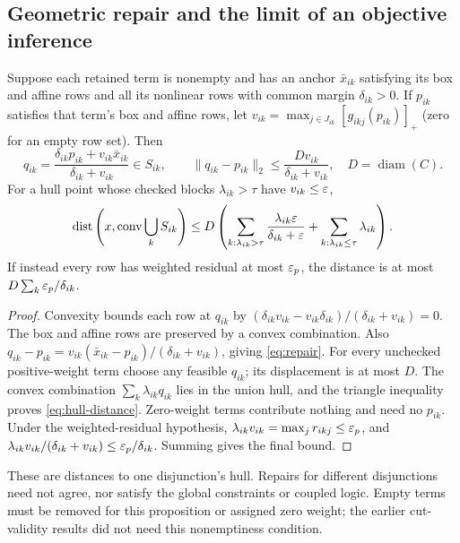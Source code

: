 \subsection{Geometric repair and the limit of an objective inference}
\begin{proposition}\label{prop:repair}
Suppose each retained term is nonempty and has an anchor $\bar x_{ik}$ satisfying its box and affine rows and all its nonlinear rows with common margin $\delta_{ik}>0$. If $p_{ik}$ satisfies that term's box and affine rows, let $v_{ik}=\max_{j\in J_{ik}}[g_{ikj}(p_{ik})]_+$ (zero for an empty row set). Then
\begin{equation}\label{eq:repair}
 q_{ik}=\frac{\delta_{ik}p_{ik}+v_{ik}\bar x_{ik}}{\delta_{ik}+v_{ik}}\in S_{ik},
 \qquad \|q_{ik}-p_{ik}\|_2\le\frac{D v_{ik}}{\delta_{ik}+v_{ik}},
 \quad D=\operatorname{diam}(C).
\end{equation}
For a hull point whose checked blocks $\lambda_{ik}>\tau$ have $v_{ik}\le\varepsilon$,
\begin{equation}\label{eq:hull-distance}
 \operatorname{dist}\left(x,\operatorname{conv}\bigcup_k S_{ik}\right)
 \le D\left(\sum_{k:\lambda_{ik}>\tau}\frac{\lambda_{ik}\varepsilon}{\delta_{ik}+\varepsilon}
       +\sum_{k:\lambda_{ik}\le\tau}\lambda_{ik}\right).
\end{equation}
If instead every row has weighted residual at most $\varepsilon_p$, the distance is at most $D\sum_k\varepsilon_p/\delta_{ik}$.
\end{proposition}
\begin{proof}
Convexity bounds each row at $q_{ik}$ by
$(\delta_{ik}v_{ik}-v_{ik}\delta_{ik})/(\delta_{ik}+v_{ik})=0$.
The box and affine rows are preserved by a convex combination. Also
$q_{ik}-p_{ik}=v_{ik}(\bar x_{ik}-p_{ik})/(\delta_{ik}+v_{ik})$, giving \eqref{eq:repair}. For every unchecked positive-weight term choose any feasible $q_{ik}$; its displacement is at most $D$. The convex combination $\sum_k\lambda_{ik}q_{ik}$ lies in the union hull, and the triangle inequality proves \eqref{eq:hull-distance}. Zero-weight terms contribute nothing and need no $p_{ik}$. Under the weighted-residual hypothesis, $\lambda_{ik}v_{ik}=\max_jr_{ikj}\le\varepsilon_p$, and
$\lambda_{ik}v_{ik}/(\delta_{ik}+v_{ik})\le\varepsilon_p/\delta_{ik}$.
Summing gives the final bound.
\end{proof}
These are distances to one disjunction's hull. Repairs for different disjunctions need not agree, nor satisfy the global constraints or coupled logic. Empty terms must be removed for this proposition or assigned zero weight; the earlier cut-validity results did not need this nonemptiness condition.


